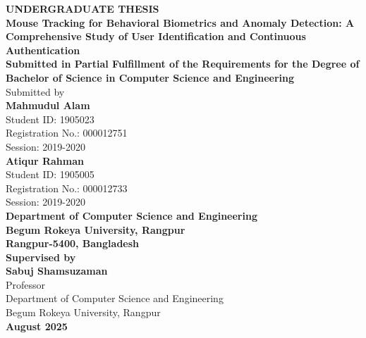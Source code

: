 \documentclass[
  11pt,
  a4paper,
]{article}
\author{}
\date{}
\begin{document}
\renewcommand*\contentsname{TABLE OF CONTENTS}
{
\setcounter{tocdepth}{3}
\tableofcontents
}
\newpage
\thispagestyle{empty}

\begin{center}
\vspace*{2cm}

\textbf{UNDERGRADUATE THESIS}\\[2cm]

{\LARGE \textbf{Mouse Tracking for Behavioral Biometrics and Anomaly Detection: A Comprehensive Study of User Identification and Continuous Authentication}}\\[2cm]

\textbf{Submitted in Partial Fulfillment of the Requirements for the Degree of}\\[0.5cm]
\textbf{Bachelor of Science in Computer Science and Engineering}\\[2cm]

Submitted by\\[1cm]
\textbf{Mahmudul Alam}\\
Student ID: 1905023\\
Registration No.: 000012751\\
Session: 2019-2020\\[1cm]

\textbf{Atiqur Rahman}\\
Student ID: 1905005\\
Registration No.: 000012733\\
Session: 2019-2020\\[2cm]

\textbf{Department of Computer Science and Engineering}\\
\textbf{Begum Rokeya University, Rangpur}\\
\textbf{Rangpur-5400, Bangladesh}\\[2cm]

\textbf{Supervised by}\\[0.5cm]
\textbf{Sabuj Shamsuzaman}\\
Professor\\
Department of Computer Science and Engineering\\
Begum Rokeya University, Rangpur\\[1.5cm]

\textbf{August 2025}

\vspace*{\fill}
\end{center}

\newpage
\end{document}

